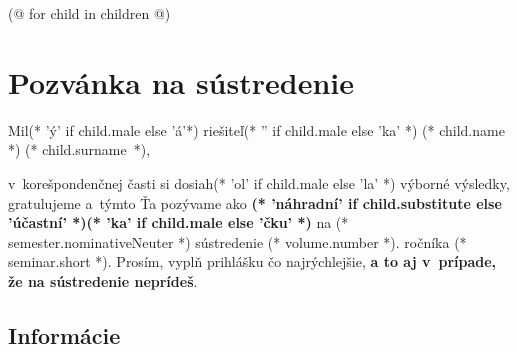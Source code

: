 \documentclass[12pt, twoside]{article}
\begin{document}
    \pagestyle{main}
    
    (@ for child in children @)
    \thispagestyle{first}
    \section{Pozvánka na sústredenie}
        Mil(* 'ý' if child.male else 'á'*) riešiteľ(* '' if child.male else 'ka' *) (* child.name *) (* child.surname *),

        v~korešpondenčnej časti si dosiah(* 'ol' if child.male else 'la' *) výborné výsledky,
        gratulujeme a~týmto Ťa pozývame ako \textbf{(* 'náhradní' if child.substitute else 'účastní' *)(* 'ka' if child.male else 'čku' *)}
        na (* semester.nominativeNeuter *) sústredenie (* volume.number *). ročníka (* seminar.short *).
        Prosím, vyplň prihlášku čo najrýchlejšie, \textbf{a to aj v~prípade, že na sústredenie neprídeš}.

    \subsection{Informácie}
\end{document}
